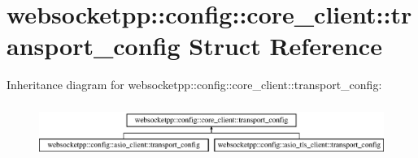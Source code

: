 \hypertarget{structwebsocketpp_1_1config_1_1core__client_1_1transport__config}{}\section{websocketpp\+:\+:config\+:\+:core\+\_\+client\+:\+:transport\+\_\+config Struct Reference}
\label{structwebsocketpp_1_1config_1_1core__client_1_1transport__config}
Inheritance diagram for websocketpp\+:\+:config\+:\+:core\+\_\+client\+:\+:transport\+\_\+config\+:\begin{figure}[H]
\begin{center}
\leavevmode
\includegraphics[height=1.766562cm]{structwebsocketpp_1_1config_1_1core__client_1_1transport__config}
\end{center}
\end{figure}
